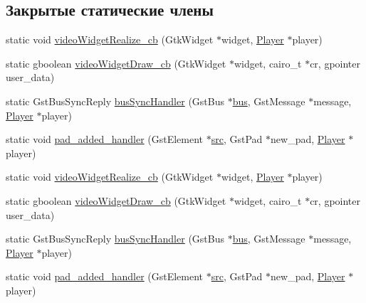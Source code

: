 \subsection*{Закрытые статические члены}
\begin{DoxyCompactItemize}
\item 
static void \hyperlink{class_player_aeb024ba54089ecaf90753a6f6b8d07bc}{video\+Widget\+Realize\+\_\+cb} (Gtk\+Widget $\ast$widget, \hyperlink{class_player}{Player} $\ast$player)
\item 
static gboolean \hyperlink{class_player_a31a79db48e8ebebddacd1bd76bf16f3d}{video\+Widget\+Draw\+\_\+cb} (Gtk\+Widget $\ast$widget, cairo\+\_\+t $\ast$cr, gpointer user\+\_\+data)
\item 
static Gst\+Bus\+Sync\+Reply \hyperlink{class_player_a987a5a6f6bf24f530536090e9a832ef6}{bus\+Sync\+Handler} (Gst\+Bus $\ast$\hyperlink{class_player_a746993d3cf67692b460334b0e0ede459}{bus}, Gst\+Message $\ast$message, \hyperlink{class_player}{Player} $\ast$player)
\item 
static void \hyperlink{class_player_a43527d455f9de17468deb13fef887854}{pad\+\_\+added\+\_\+handler} (Gst\+Element $\ast$\hyperlink{class_player_ac3fb217cb2001134249fafcba07fe7e7}{src}, Gst\+Pad $\ast$new\+\_\+pad, \hyperlink{class_player}{Player} $\ast$player)
\item 
static void \hyperlink{class_player_a6a18c90131b03493e506d50d16925436}{video\+Widget\+Realize\+\_\+cb} (Gtk\+Widget $\ast$widget, \hyperlink{class_player}{Player} $\ast$player)
\item 
static gboolean \hyperlink{class_player_a3e6f827b42b56e7685a66e739d643ecc}{video\+Widget\+Draw\+\_\+cb} (Gtk\+Widget $\ast$widget, cairo\+\_\+t $\ast$cr, gpointer user\+\_\+data)
\item 
static Gst\+Bus\+Sync\+Reply \hyperlink{class_player_a4f4e39756894a693bc45515f9eeded97}{bus\+Sync\+Handler} (Gst\+Bus $\ast$\hyperlink{class_player_a746993d3cf67692b460334b0e0ede459}{bus}, Gst\+Message $\ast$message, \hyperlink{class_player}{Player} $\ast$player)
\item 
static void \hyperlink{class_player_a3e74802e5bf9b62f5a0908637ace1913}{pad\+\_\+added\+\_\+handler} (Gst\+Element $\ast$\hyperlink{class_player_ac3fb217cb2001134249fafcba07fe7e7}{src}, Gst\+Pad $\ast$new\+\_\+pad, \hyperlink{class_player}{Player} $\ast$player)
\end{DoxyCompactItemize}
